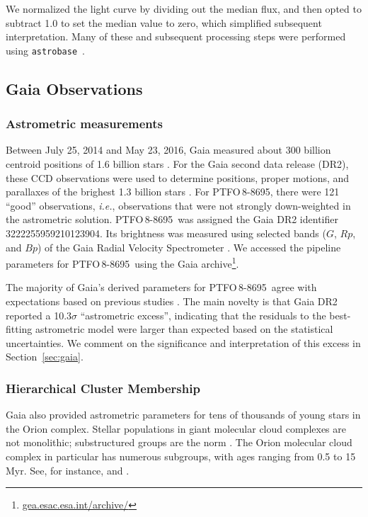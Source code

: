 \documentclass[12pt,twocolumn,tighten,trackchanges]{aastex62}
\newcommand{\ptfo}{PTFO$\,$8-8695}
\begin{document}
We normalized the light curve by dividing out the median flux, and
then opted to subtract 1{.}0 to set the median value to zero, which
simplified subsequent interpretation.  Many of these and subsequent
processing steps were performed using
\texttt{astrobase}~\citep{bhatti_astrobase_2018}. 


\subsection{Gaia Observations}

\subsubsection{Astrometric measurements}

Between July 25, 2014 and May 23, 2016, Gaia measured about 300
billion centroid positions of 1{.}6 billion stars
\citep{gaia_collaboration_gaia_2016,lindegren_gaiasoln_2018,gaia_collaboration_gaia_2018}.
For the Gaia second data release (DR2), these CCD observations were
used to determine positions, proper motions, and parallaxes of the
brighest 1{.}3 billion stars \citep{lindegren_gaiasoln_2018}.  For
\ptfo, there were 121 ``good'' observations, {\it i.e.}, observations
that were not strongly down-weighted in the astrometric solution.
\ptfo\ was assigned the Gaia DR2 identifier 3222255959210123904.  Its
brightness was measured using selected bands ($G$, $Rp$, and $Bp$) of
the Gaia Radial Velocity Spectrometer
\citep{cropper_gaia_2018,evans_gaia_2018}.  We accessed the pipeline
parameters for \ptfo\ using the Gaia
archive\footnote{\url{gea.esac.esa.int/archive/}}.

The majority of Gaia's derived parameters for \ptfo\ agree with
expectations based on previous studies
\citep{briceno_cida_2005,van_eyken_ptf_2012}.  The main novelty is
that Gaia DR2 reported a 10.3$\sigma$ ``astrometric excess'',
indicating that the residuals to the best-fitting astrometric model
were larger than expected based on the statistical uncertainties.  We
comment on the significance and interpretation of this excess in
Section~\ref{sec:gaia}.


\subsubsection{Hierarchical Cluster Membership}
\label{subsec:hierarchical}

Gaia also provided astrometric parameters for tens of thousands of
young stars in the Orion complex.  Stellar populations in giant
molecular cloud complexes are not monolithic; substructured groups are
the norm \citep{briceno_lowmassOB_2007}.  The Orion molecular cloud
complex in particular has numerous subgroups, with ages ranging from
0.5 to 15$\,$Myr. See, for instance,
\citet{briceno_cida_2005,jeffries_kinematic_2006,briceno_25_2007,kounkel_apogee2_2018}
and \citet{briceno_cidaII_2019}.
\end{document}
